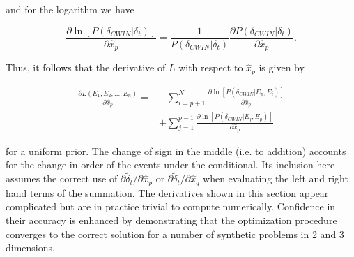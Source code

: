 \documentclass[12pt,double]{article}
\begin{document}
and for the logarithm we have
\begin{linenomath*} \begin{equation}
\frac{ \partial \ln \left[ P(\delta_{CWIN}|\delta_t) \right] } {\partial \hat{x}_p}
= \frac{1}{P(\delta_{CWIN}|\delta_t)} \frac{\partial P(\delta_{CWIN}|\delta_t)}{\partial \hat{x}_p}.
\end{equation} \end{linenomath*}


Thus, it follows that the derivative of $L$ with respect to $\hat{x}_p$ is given by
\begin{linenomath*} \begin{equation}   
\label{eq-derivative-Lstar-cwionly}
\begin{array}{ll}
\frac{\partial L(E_1, E_2, ..., E_n)}{\partial \hat{x}_p} = &
- \sum_{i=p+1}^{N} \frac{ \partial \ln \left[P(\delta_{CWIN}|E_p,E_i)\right]}{\partial \hat{x}_p} \\
 & + \sum_{j=1}^{p-1} \frac{ \partial \ln \left[P(\delta_{CWIN}|E_j,E_p)\right]}{\partial \hat{x}_p}
\end{array}
\end{equation} \end{linenomath*}
%
for a uniform prior. The change of sign in the middle (i.e. to
addition) accounts for the change in order of the events under the
conditional. Its inclusion here assumes the correct use of $\partial
\widetilde{\delta}_t / \partial \hat{x}_p$ or $\partial
\widetilde{\delta}_t / \partial \hat{x}_q$ when evaluating the left
and right hand terms of the summation. The derivatives shown in this
section appear complicated but are in practice trivial to compute
numerically. Confidence in their accuracy is enhanced by
demonstrating that the optimization procedure converges to the
correct solution for a number of synthetic problems in 2 and 3
dimensions.


\clearpage









\label{lastpage}
\end{document}
